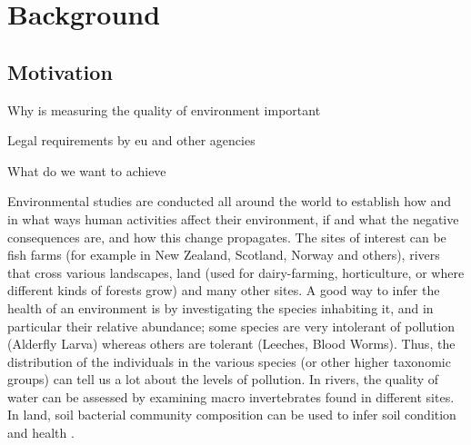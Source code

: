 
\chapter{Background}  %

\ifpdf
    \graphicspath{{Chapter1/Figs/Raster/}{Chapter1/Figs/PDF/}{Chapter1/Figs/}}
\else
    \graphicspath{{Chapter1/Figs/Vector/}{Chapter1/Figs/}}
\fi


\section{Motivation}
Why is measuring the quality of environment important

Legal requirements by eu and other agencies

What do we want to achieve

Environmental studies are conducted all around the world to establish how and in what ways human activities affect their environment, if and what the negative consequences are, and how this change propagates. The sites of interest can be fish farms (for example in New Zealand, Scotland, Norway and others), rivers that cross various landscapes, land (used for dairy-farming, horticulture, or where different kinds of forests grow) and many other sites. A good way to infer the health of an environment is by investigating the species inhabiting it, and in particular their relative abundance; some species are very intolerant of pollution (Alderfly Larva) whereas others are tolerant (Leeches, Blood Worms). Thus, the distribution of the individuals in the various species (or other higher taxonomic groups) can tell us a lot about the levels of pollution. In rivers, the quality of water can be assessed by examining macro invertebrates found in different sites. In land, soil bacterial community composition can be used to infer soil condition and health \cite{hermans_bacteria_2016}.

